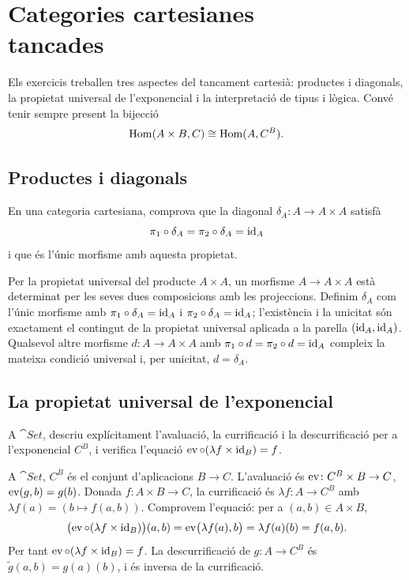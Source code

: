 \chapter[Cartesianes tancades]{\texorpdfstring{Categories cartesianes\\ tancades}{Categories cartesianes tancades}}

Els exercicis treballen tres aspectes del tancament cartesià: productes i diagonals, la propietat universal de l'exponencial i la interpretació de tipus i lògica. Convé tenir sempre present la bijecció
\[
\operatorname{Hom}(A\times B,C)\cong\operatorname{Hom}(A,C^{B}).
\]

\section{Productes i diagonals}

\begin{exercici}
En una categoria cartesiana, comprova que la diagonal $\delta_A\colon A\to A\times A$ satisfà
\[
\pi_1\circ\delta_A=\pi_2\circ\delta_A=\operatorname{id}_A
\]
i que és l'únic morfisme amb aquesta propietat.
\end{exercici}

\begin{solucio}
Per la propietat universal del producte $A\times A$, un morfisme $A\to A\times A$ està determinat per les seves dues composicions amb les projeccions. Definim $\delta_A$ com l'únic morfisme amb $\pi_1\circ\delta_A=\operatorname{id}_A$ i $\pi_2\circ\delta_A=\operatorname{id}_A$; l'existència i la unicitat són exactament el contingut de la propietat universal aplicada a la parella $(\operatorname{id}_A,\operatorname{id}_A)$. Qualsevol altre morfisme $d\colon A\to A\times A$ amb $\pi_1\circ d=\pi_2\circ d=\operatorname{id}_A$ compleix la mateixa condició universal i, per unicitat, $d=\delta_A$.
\end{solucio}

\section{La propietat universal de l'exponencial}

\begin{exercici}
A $\cat{Set}$, descriu explícitament l'avaluació, la currificació i la descurrificació per a l'exponencial $C^{B}$, i verifica l'equació $\operatorname{ev}\circ(\lambda f\times\operatorname{id}_B)=f$.
\end{exercici}

\begin{solucio}
A $\cat{Set}$, $C^{B}$ és el conjunt d'aplicacions $B\to C$. L'avaluació és $\operatorname{ev}\colon C^{B}\times B\to C$, $\operatorname{ev}(g,b)=g(b)$. Donada $f\colon A\times B\to C$, la currificació és $\lambda f\colon A\to C^{B}$ amb $\lambda f(a)=(b\mapsto f(a,b))$. Comprovem l'equació: per a $(a,b)\in A\times B$,
\[
\bigl(\operatorname{ev}\circ(\lambda f\times\operatorname{id}_B)\bigr)(a,b)=\operatorname{ev}\bigl(\lambda f(a),b\bigr)=\lambda f(a)(b)=f(a,b).
\]
Per tant $\operatorname{ev}\circ(\lambda f\times\operatorname{id}_B)=f$. La descurrificació de $g\colon A\to C^{B}$ és $\widetilde g(a,b)=g(a)(b)$, i és inversa de la currificació.
\end{solucio}


